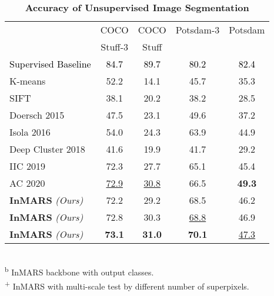 \documentclass[letterpaper, 10 pt, journal, twoside]{IEEEtran}
\newcommand{\revised}{\textcolor{black}}{}
\begin{document}
\begin{table}
\begin{center}
\scriptsize

\caption{\textbf{Accuracy of Unsupervised Image Segmentation}}
\label{table-acc:long}
\label{table-acc:onecol}
\begin{tabular}{|l|c|c|c|c|}
\hline
& COCO & COCO & Potsdam-3 & Potsdam\\
& Stuff-3 & Stuff & & \\
\hline\hline
\revised{Supervised Baseline} & \revised{84.7} & \revised{89.7} & \revised{80.2} & \revised{82.4} \\
\hdashline
K-means \cite{Pedregosa2011scikit-learn}
& 52.2 & 14.1 & 45.7 & 35.3 \\
SIFT \cite{Lowe:2004:DIF:993451.996342}
& 38.1 & 20.2 & 38.2 & 28.5 \\
Doersch 2015 \cite{Doersch}
& 47.5 & 23.1 & 49.6 & 37.2 \\
Isola 2016 \cite{isola2015learning}
& 54.0 & 24.3 & 63.9 & 44.9 \\
Deep Cluster 2018 \cite{DeepCluster}
& 41.6 & 19.9 & 41.7 & 29.2 \\
IIC 2019 \cite{IIC}
& 72.3 & 27.7 & 65.1 & 45.4 \\
AC 2020 \cite{ARL}
& \underline{72.9} & \underline{30.8} & 66.5 & \textbf{49.3} \\
\hline
\textbf{InMARS} \textit{(Ours)}
& 72.2 & 29.2 & 68.5 & 46.2 \\
\textbf{InMARS} \textit{(Ours)}
& 72.8 & 30.3 &  \underline{68.8} & 46.9 \\
\textbf{InMARS} \textit{(Ours)}
&\textbf{73.1} &\textbf{31.0} &\textbf{70.1} & \underline{47.3} \\
\hline

\end{tabular}
\footnotesize{\\\textsuperscript{b} InMARS backbone with  output classes.}
\footnotesize{\\\textsuperscript{+} InMARS with multi-scale test by different number of superpixels.}
\end{center}
\end{table}
\par
\end{document}
